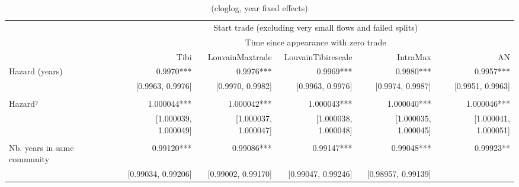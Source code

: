 \begin{table}[!h]
\caption{(cloglog, year fixed effects)}
\centering
\begin{tabular}{llllll}
\cline{1-6}
\multicolumn{1}{c}{} &
  \multicolumn{5}{|c}{Start trade (excluding very small flows and failed splits)} \\
\multicolumn{1}{c}{} &
  \multicolumn{5}{|c}{Time since appearance with zero trade} \\
\multicolumn{1}{c}{} &
  \multicolumn{1}{|r}{Tibi} &
  \multicolumn{1}{r}{LouvainMaxtrade} &
  \multicolumn{1}{r}{LouvainTibirescale} &
  \multicolumn{1}{r}{IntraMax} &
  \multicolumn{1}{r}{AN} \\
\cline{1-6}
\multicolumn{1}{l}{Hazard (years)} &
  \multicolumn{1}{|r}{0.9970***} &
  \multicolumn{1}{r}{0.9976***} &
  \multicolumn{1}{r}{0.9969***} &
  \multicolumn{1}{r}{0.9980***} &
  \multicolumn{1}{r}{0.9957***} \\
\multicolumn{1}{l}{} &
  \multicolumn{1}{|r}{[0.9963, 0.9976]} &
  \multicolumn{1}{r}{[0.9970, 0.9982]} &
  \multicolumn{1}{r}{[0.9963, 0.9976]} &
  \multicolumn{1}{r}{[0.9974, 0.9987]} &
  \multicolumn{1}{r}{[0.9951, 0.9963]} \\
\multicolumn{1}{l}{} &
  \multicolumn{1}{|r}{} &
  \multicolumn{1}{r}{} &
  \multicolumn{1}{r}{} &
  \multicolumn{1}{r}{} &
  \multicolumn{1}{r}{} \\
\multicolumn{1}{l}{Hazard²} &
  \multicolumn{1}{|r}{1.000044***} &
  \multicolumn{1}{r}{1.000042***} &
  \multicolumn{1}{r}{1.000043***} &
  \multicolumn{1}{r}{1.000040***} &
  \multicolumn{1}{r}{1.000046***} \\
\multicolumn{1}{l}{} &
  \multicolumn{1}{|r}{[1.000039, 1.000049]} &
  \multicolumn{1}{r}{[1.000037, 1.000047]} &
  \multicolumn{1}{r}{[1.000038, 1.000048]} &
  \multicolumn{1}{r}{[1.000035, 1.000045]} &
  \multicolumn{1}{r}{[1.000041, 1.000051]} \\
\multicolumn{1}{l}{} &
  \multicolumn{1}{|r}{} &
  \multicolumn{1}{r}{} &
  \multicolumn{1}{r}{} &
  \multicolumn{1}{r}{} &
  \multicolumn{1}{r}{} \\
\multicolumn{1}{l}{Nb. years in same community} &
  \multicolumn{1}{|r}{0.99120***} &
  \multicolumn{1}{r}{0.99086***} &
  \multicolumn{1}{r}{0.99147***} &
  \multicolumn{1}{r}{0.99048***} &
  \multicolumn{1}{r}{0.99923**} \\
\multicolumn{1}{l}{} &
  \multicolumn{1}{|r}{[0.99034, 0.99206]} &
  \multicolumn{1}{r}{[0.99002, 0.99170]} &
  \multicolumn{1}{r}{[0.99047, 0.99246]} &
  \multicolumn{1}{r}{[0.98957, 0.99139]} &

\end{tabular}
\end{table}
